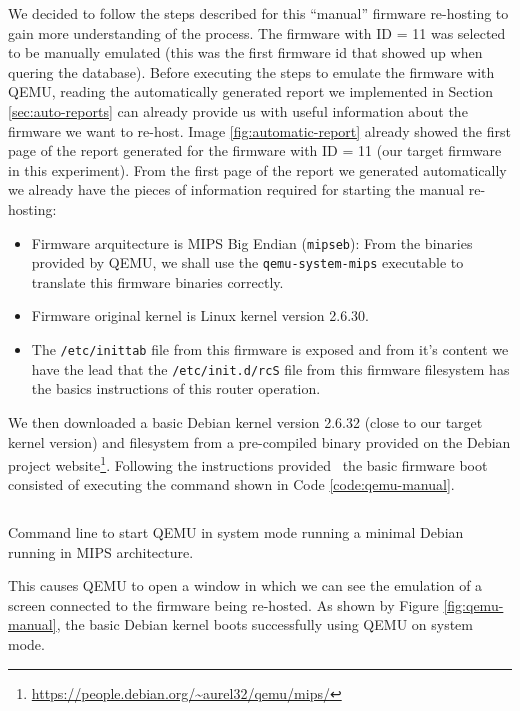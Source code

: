 We decided to follow the steps described for this ``manual'' firmware re-hosting to gain more understanding of the process. The firmware with ID = 11 was selected to be manually emulated (this was the first firmware id that showed up when quering the database). Before executing the steps to emulate the firmware with QEMU, reading the automatically generated report we implemented in Section \ref{sec:auto-reports} can already provide us with useful information about the firmware we want to re-host. Image \ref{fig:automatic-report} already showed the first page of the report generated for the firmware with ID = 11 (our target firmware in this experiment). From the first page of the report we generated automatically we already have the pieces of information required for starting the manual re-hosting:

\begin{itemize}
    \item Firmware arquitecture is MIPS Big Endian ({\tt mipseb}): From the binaries provided by QEMU, we shall use the {\tt qemu-system-mips} executable to translate this firmware binaries correctly.
    \item Firmware original kernel is Linux kernel version 2.6.30.
    \item The {\tt /etc/inittab} file from this firmware is exposed and from it's content we have the lead that the {\tt /etc/init.d/rcS} file from this firmware filesystem has the basics instructions of this router operation.
\end{itemize}

We then downloaded a basic Debian kernel version 2.6.32 (close to our target kernel version) and filesystem from a pre-compiled binary provided on the Debian project website\footnote{\url{https://people.debian.org/~aurel32/qemu/mips/}}. Following the instructions provided~\cite{victor-sales} the basic firmware boot consisted of executing the command shown in Code \ref{code:qemu-manual}.

\begin{listing}[!ht]
\inputminted[fontsize=\footnotesize,breaklines]{text}{Code/qemu-manual}
\caption{Command line to start QEMU in system mode running a minimal Debian running in MIPS architecture.}
\label{code:qemu-manual}
\end{listing}

This causes QEMU to open a window in which we can see the emulation of a screen connected to the firmware being re-hosted. As shown by Figure \ref{fig:qemu-manual}, the basic Debian kernel boots successfully using QEMU on system mode.


